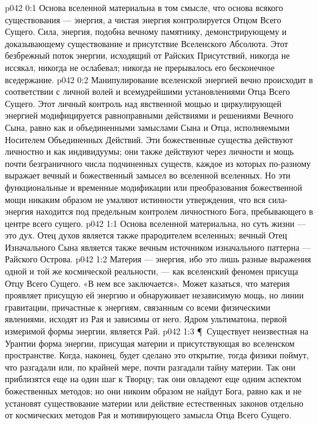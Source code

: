 \vs p042 0:1 Основа вселенной материальна в том смысле, что основа всякого существования --- энергия, а чистая энергия контролируется Отцом Всего Сущего. Сила, энергия, подобна вечному памятнику, демонстрирующему и доказывающему существование и присутствие Вселенского Абсолюта. Этот безбрежный поток энергии, исходящий от Райских Присутствий, никогда не иссякал, никогда не ослабевал; никогда не прерывалось его бесконечное вседержание.
\vs p042 0:2 Манипулирование вселенской энергией вечно происходит в соответствии с личной волей и всемудрейшими установлениями Отца Всего Сущего. Этот личный контроль над явственной мощью и циркулирующей энергией модифицируется равноправными действиями и решениями Вечного Сына, равно как и объединенными замыслами Сына и Отца, исполняемыми Носителем Объединенных Действий. Эти божественные существа действуют личностно и как индивидуумы; они также действуют через личности и мощь почти безграничного числа подчиненных существ, каждое из которых по\hyp{}разному выражает вечный и божественный замысел во вселенной вселенных. Но эти функциональные и временные модификации или преобразования божественной мощи никаким образом не умаляют истинности утверждения, что вся сила\hyp{}энергия находится под предельным контролем личностного Бога, пребывающего в центре всего сущего.
\vs p042 1:1 Основа вселенной материальна, но суть жизни --- это дух. Отец духов является также прародителем вселенных; вечный Отец Изначального Сына является также вечным источником изначального паттерна --- Райского Острова.
\vs p042 1:2 Материя --- энергия, ибо это лишь разные выражения одной и той же космической реальности, --- как вселенский феномен присуща Отцу Всего Сущего. «В нем все заключается». Может казаться, что материя проявляет присущую ей энергию и обнаруживает независимую мощь, но линии гравитации, причастные к энергиям, связанным со всеми физическими явлениями, исходят из Рая и зависимы от него. Ядром ультиматона, первой измеримой формы энергии, является Рай.
\vs p042 1:3 \P\ Существует неизвестная на Урантии форма энергии, присущая материи и присутствующая во вселенском пространстве. Когда, наконец, будет сделано это открытие, тогда физики поймут, что разгадали или, по крайней мере, почти разгадали тайну материи. Так они приблизятся еще на один шаг к Творцу; так они овладеют еще одним аспектом божественных методов; но они никоим образом не найдут Бога, равно как и не установят существование материи или действие естественных законов отдельно от космических методов Рая и мотивирующего замысла Отца Всего Сущего.
